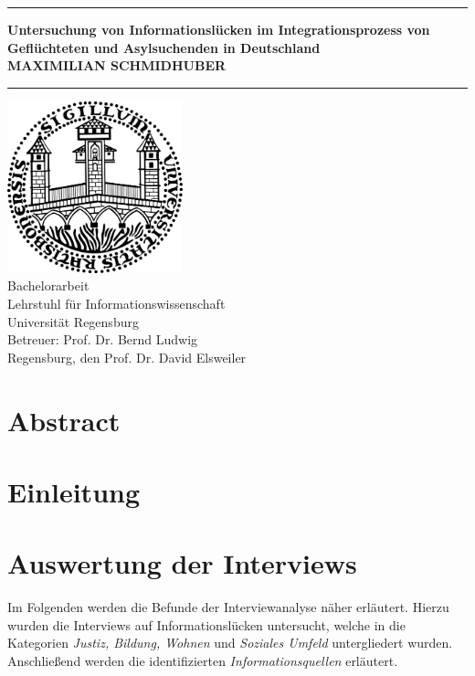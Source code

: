 \documentclass[12pt,oneside]{article}
\newcommand{\JMUTitle}[9]{

  \thispagestyle{empty}
  \vspace*{\stretch{1}}
  {\parindent0cm
  \rule{\linewidth}{.7ex}}
  \begin{flushright}
    \vspace*{\stretch{1}}
    \sffamily\bfseries\Huge
    #1\\
    \vspace*{\stretch{1}}
    \sffamily\bfseries\large
    #2
    \vspace*{\stretch{1}}
  \end{flushright}
  \rule{\linewidth}{.7ex}

  \vspace*{\stretch{1}}
  \begin{center}
    \includegraphics[width=2in]{Unisiegel.png} \\
    \vspace*{\stretch{1}}
    \Large Bachelorarbeit  \\

    \vspace*{\stretch{2}}
   \large Lehrstuhl f\"{u}r Informationswissenschaft\\
    \large Universität Regensburg\\
    \vspace*{\stretch{1}}
    \large Betreuer:  #7 \\[1mm]
    
    \vspace*{\stretch{1}}
    \large Regensburg, den #6
  \end{center}
}
\begin{document}
  \JMUTitle
      {Untersuchung von Informationslücken im Integrationsprozess von Geflüchteten und Asylsuchenden in Deutschland}        %
      {MAXIMILIAN SCHMIDHUBER}                  %
      
      {Fakultät für Sprach-, Literatur- und Kulturwissenschaften}  %
      {Regensburg 2019}                          %
      {24.05.2019}                              %
      {Prof. Dr. David Elsweiler}               %
      {Prof. Dr. Bernd Ludwig}                  %
      
  \clearpage

\lhead{}
    \setcounter{page}{1}

\tableofcontents
\clearpage

\listoffigures

\listoftables
\clearpage

\section*{Abstract}

\blindtext


\cleardoublepage
{}  
    \setcounter{page}{1}
\lhead{\nouppercase{\leftmark}}


\section{Einleitung} \label{einleitung}









\section{Auswertung der Interviews}
Im Folgenden werden die Befunde der Interviewanalyse näher erläutert. Hierzu wurden die Interviews auf Informationslücken untersucht, welche in die Kategorien \textit{Justiz, Bildung, Wohnen} und \textit{Soziales Umfeld} untergliedert wurden. Anschließend werden die identifizierten \textit{Informationsquellen} erläutert.
\end{document}
